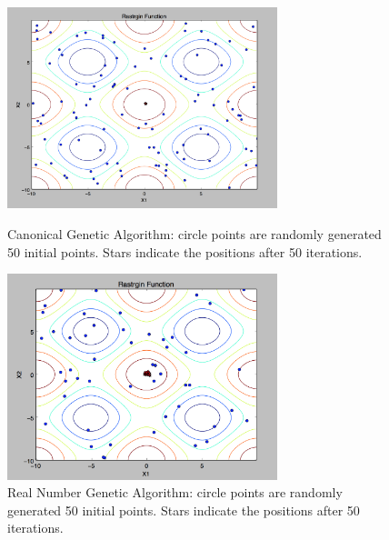 \documentclass{article}
\begin{document}
\begin{figure} [h]
\includegraphics[width=0.7\textwidth]{GA_canonical}
\centering
\caption{Canonical Genetic Algorithm: circle points are randomly generated 50 initial points. Stars indicate the positions after 50 iterations. }

\includegraphics[width=0.7\textwidth]{GA_real_number}
\centering
\caption{Real Number Genetic Algorithm: circle points are randomly generated 50 initial points. Stars indicate the positions after 50 iterations. }

\end{figure}
\end{document}
